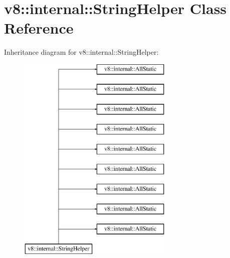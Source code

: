 \hypertarget{classv8_1_1internal_1_1_string_helper}{}\section{v8\+:\+:internal\+:\+:String\+Helper Class Reference}
\label{classv8_1_1internal_1_1_string_helper}
Inheritance diagram for v8\+:\+:internal\+:\+:String\+Helper\+:\begin{figure}[H]
\begin{center}
\leavevmode
\includegraphics[height=10.000000cm]{classv8_1_1internal_1_1_string_helper}
\end{center}
\end{figure}

